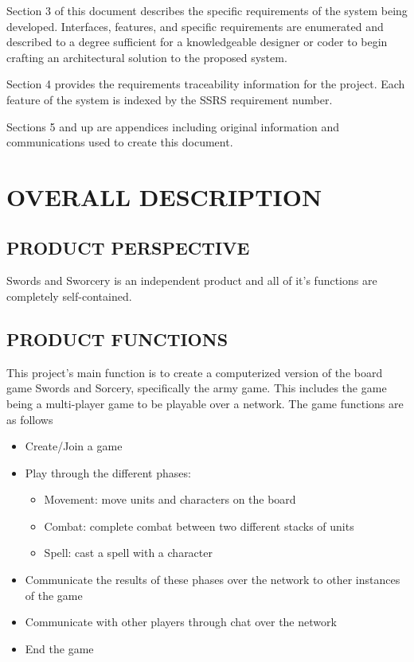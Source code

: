 \documentclass[twoside,letterpaper,pdftex]{article}
\begin{document}
\bigskip

{
Section 3 of this document describes the specific requirements of
the system being developed. Interfaces, features, and specific
requirements are enumerated and described to a degree sufficient
for a knowledgeable designer or coder to
begin crafting an architectural solution to the proposed system.}


\bigskip

{
Section 4 provides the requirements traceability information for the
project. Each feature of the system is indexed by
the SSRS requirement number.}


\bigskip

{
Sections 5 and up are appendices including original information and
communications used to create this document.}

\clearpage\section[OVERALL DESCRIPTION]{\rmfamily\bfseries OVERALL DESCRIPTION}
\hypertarget{RefHeading17059017292}{}{
{\textit{ }}}

\subsection[PRODUCT PERSPECTIVE]{\rmfamily\bfseries PRODUCT PERSPECTIVE}
\hypertarget{RefHeading17259017292}{}{
\foreignlanguage{english}{\textit{ }}}

{\color{black}
Swords and Sworcery is an independent product and all of it's functions are completely 
self-contained.}

\subsection[PRODUCT FUNCTIONS]{\rmfamily\bfseries PRODUCT FUNCTIONS}
\hypertarget{RefHeading17459017292}{}{\itshape
}

This project's main function is to create a computerized version of the board
game Swords and Sorcery, specifically the army game. This includes the game 
being a multi-player game to be playable over a network. The game functions
are as follows

\begin{itemize}
\item Create/Join a game
\item Play through the different phases:
\begin{itemize}
  \item Movement: move units and characters on the board
  \item Combat: complete combat between two different stacks of units
  \item Spell: cast a spell with a character
\end{itemize}
\item Communicate the results of these phases over the network to other instances of the game
\item Communicate with other players through chat over the network
\item End the game
\end{itemize}
\end{document}
